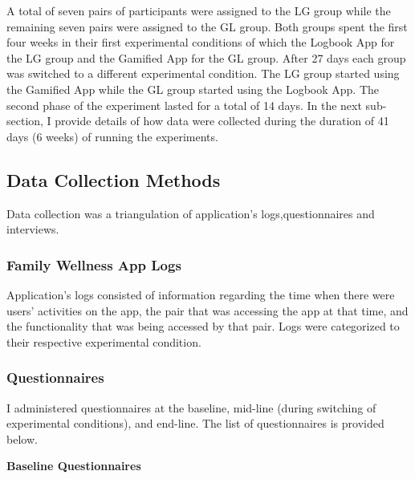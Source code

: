 A total of seven pairs of participants were assigned to the LG group while the remaining seven pairs were assigned to the GL group. Both groups spent the first four weeks in their first experimental conditions of which the Logbook App for the LG group and the Gamified App for the GL group. After 27 days each group was switched to a different experimental condition. The LG group started using the Gamified App while the GL group started using the Logbook App. The second phase of the experiment lasted for a total of 14 days. In the next sub-section, I provide details of how data were collected during the duration of 41 days (6 weeks) of running the experiments. 

\subsection{Data Collection Methods}
Data collection was a triangulation of application's logs,questionnaires and interviews. 
\subsubsection{Family Wellness App Logs}
Application's logs consisted of information regarding the time when there were users' activities on the app, the pair that was accessing the app at that time, and the functionality that was being accessed by that pair. Logs were categorized to their respective experimental condition. 
\subsubsection{Questionnaires}
I administered questionnaires at the baseline, mid-line (during switching of experimental conditions), and end-line. The list of questionnaires is provided below.

\textbf{Baseline Questionnaires}

